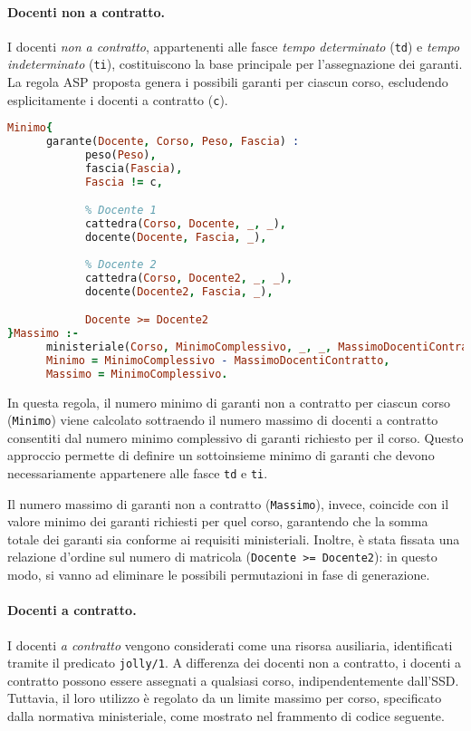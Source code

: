 \paragraph{Docenti non a contratto.}
I docenti \textit{non a contratto}, appartenenti alle fasce \textit{tempo determinato} 
(\texttt{td}) e \textit{tempo indeterminato} (\texttt{ti}), costituiscono la base principale 
per l'assegnazione dei garanti. La regola ASP proposta genera i possibili garanti per ciascun corso, 
escludendo esplicitamente i docenti a contratto (\texttt{c}).

\begin{lstlisting}[language=prolog, caption=Generazione dei garanti non a contratto.]
Minimo{
      garante(Docente, Corso, Peso, Fascia) :
            peso(Peso),
            fascia(Fascia),
            Fascia != c,

            % Docente 1
            cattedra(Corso, Docente, _, _),
            docente(Docente, Fascia, _),
            
            % Docente 2
            cattedra(Corso, Docente2, _, _),
            docente(Docente2, Fascia, _),

            Docente >= Docente2
}Massimo :-
      ministeriale(Corso, MinimoComplessivo, _, _, MassimoDocentiContratto),
      Minimo = MinimoComplessivo - MassimoDocentiContratto,
      Massimo = MinimoComplessivo.
\end{lstlisting}

In questa regola, il numero minimo di garanti non a contratto per ciascun corso (\texttt{Minimo}) 
viene calcolato sottraendo il numero massimo di docenti a contratto consentiti
dal numero minimo complessivo di garanti richiesto per il corso. 
Questo approccio permette di definire un sottoinsieme minimo di garanti che devono necessariamente 
appartenere alle fasce \texttt{td} e \texttt{ti}. 

Il numero massimo di garanti non a contratto (\texttt{Massimo}), invece, coincide con il valore 
minimo dei garanti richiesti per quel corso, garantendo che la somma totale dei garanti sia 
conforme ai requisiti ministeriali. Inoltre, è stata fissata una relazione d'ordine sul numero di 
matricola (\texttt{Docente >= Docente2}): in questo modo, si vanno ad eliminare le possibili 
permutazioni in fase di generazione.

\paragraph{Docenti a contratto.}
I docenti \textit{a contratto} vengono considerati come una risorsa ausiliaria, identificati tramite 
il predicato \texttt{jolly/1}. A differenza dei docenti non a contratto, i docenti a contratto possono 
essere assegnati a qualsiasi corso, indipendentemente dall'SSD. Tuttavia, il loro utilizzo è regolato 
da un limite massimo per corso, specificato dalla normativa ministeriale, come mostrato nel frammento
di codice seguente.


